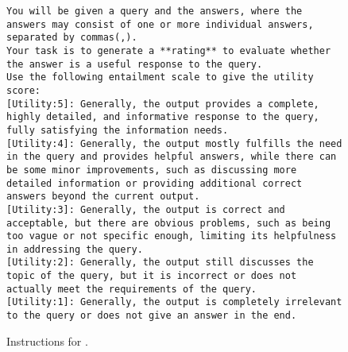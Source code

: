 \begin{figure*}[htbp]
\begin{tcolorbox}[left=1mm,right=1mm,top=0.mm, bottom=0mm,colback=white]
\begin{lstlisting}
You will be given a query and the answers, where the answers may consist of one or more individual answers, separated by commas(,). 
Your task is to generate a **rating** to evaluate whether the answer is a useful response to the query. 
Use the following entailment scale to give the utility score:
[Utility:5]: Generally, the output provides a complete, highly detailed, and informative response to the query, fully satisfying the information needs.
[Utility:4]: Generally, the output mostly fulfills the need in the query and provides helpful answers, while there can be some minor improvements, such as discussing more detailed information or providing additional correct answers beyond the current output.
[Utility:3]: Generally, the output is correct and acceptable, but there are obvious problems, such as being too vague or not specific enough, limiting its helpfulness in addressing the query. 
[Utility:2]: Generally, the output still discusses the topic of the query, but it is incorrect or does not actually meet the requirements of the query.
[Utility:1]: Generally, the output is completely irrelevant to the query or does not give an answer in the end.
\end{lstlisting}
\end{tcolorbox}
\caption{Instructions for \cuse.}
\label{fig:pro-uti}
\end{figure*}

